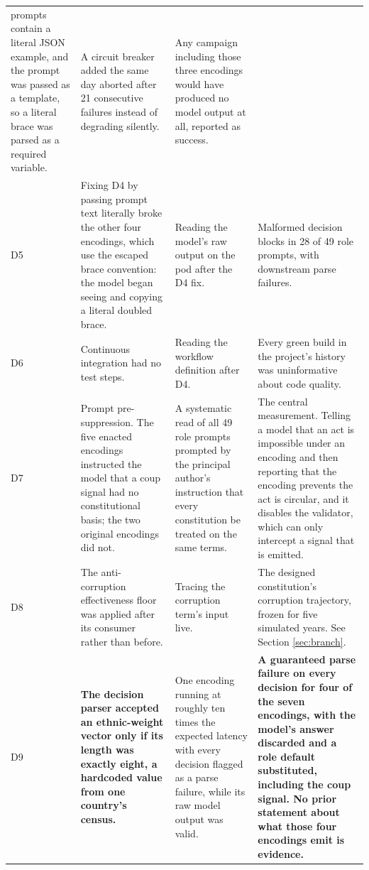 \documentclass{ieeeaccess}
\begin{document}
\begin{table}[!t]
\begin{tabular}{@{}p{0.6cm}p{4.2cm}p{4.6cm}p{6.0cm}@{}}
     prompts contain a literal JSON example, and the prompt was passed as
     a template, so a literal brace was parsed as a required variable.
   & A circuit breaker added the same day aborted after 21 consecutive
     failures instead of degrading silently.
   & Any campaign including those three encodings would have produced no
     model output at all, reported as success. \\
D5 & Fixing D4 by passing prompt text literally broke the other four
     encodings, which use the escaped brace convention: the model began
     seeing and copying a literal doubled brace.
   & Reading the model's raw output on the pod after the D4 fix.
   & Malformed decision blocks in 28 of 49 role prompts, with downstream
     parse failures. \\
D6 & Continuous integration had no test steps.
   & Reading the workflow definition after D4.
   & Every green build in the project's history was uninformative about
     code quality. \\
D7 & Prompt pre-suppression. The five enacted encodings instructed the
     model that a coup signal had no constitutional basis; the two
     original encodings did not.
   & A systematic read of all 49 role prompts prompted by the principal
     author's instruction that every constitution be treated on the same
     terms.
   & The central measurement. Telling a model that an act is impossible
     under an encoding and then reporting that the encoding prevents the
     act is circular, and it disables the validator, which can only
     intercept a signal that is emitted. \\
D8 & The anti-corruption effectiveness floor was applied after its
     consumer rather than before.
   & Tracing the corruption term's input live.
   & The designed constitution's corruption trajectory, frozen for five
     simulated years. See Section \ref{sec:branch}. \\
D9 & \textbf{The decision parser accepted an ethnic-weight vector only
     if its length was exactly eight, a hardcoded value from one country's
     census.}
   & One encoding running at roughly ten times the expected latency with
     every decision flagged as a parse failure, while its raw model output
     was valid.
   & \textbf{A guaranteed parse failure on every decision for four of the
     seven encodings, with the model's answer discarded and a role default
     substituted, including the coup signal. No prior statement about what
     those four encodings emit is evidence.} \\
\bottomrule
\end{tabular}
\end{table}
\end{document}
